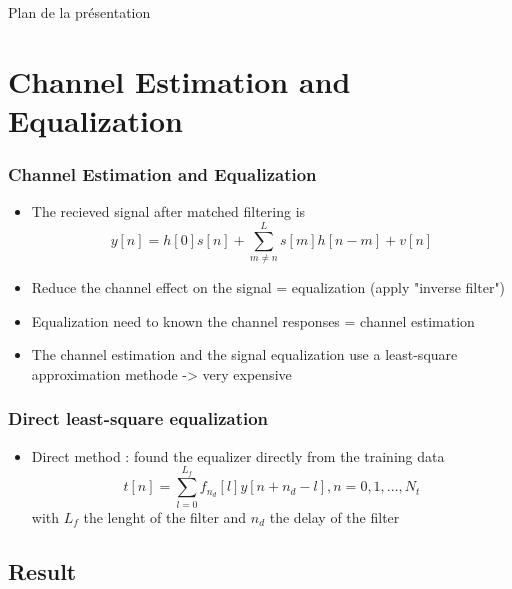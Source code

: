 \documentclass[11pt]{beamer}
\begin{document}
{
	\begin{frame}[noframenumbering]{Plan de la présentation}
		\tableofcontents
	\end{frame}
}

\section{Channel Estimation and Equalization}
\begin{frame}
\frametitle{Channel Estimation and Equalization}
\begin{itemize}
\item The recieved signal after matched filtering is
\begin{equation}
y[n] = h[0]s[n] + \sum_{m \neq n}^{L}{s[m]h[n-m]} + v[n]
\end{equation}
\item Reduce the channel effect on the signal = equalization (apply "inverse filter")
\item Equalization need to known the channel responses = channel estimation
\item The channel estimation and the signal equalization use a least-square approximation methode -> very expensive
\end{itemize}
\end{frame}

\begin{frame}
\frametitle{Direct least-square equalization}
\begin{itemize}
\item Direct method : found the equalizer directly from the training data
\begin{equation}
t[n] = \sum_{l=0}^{L_f}{f_{n_d}[l]y[n+n_d-l]}, n = 0,1,...,N_t
\end{equation}
with $L_f$ the lenght of the filter and $n_d$ the delay of the filter

\end{itemize}
\end{frame}
\subsection{Result}
\end{document}
